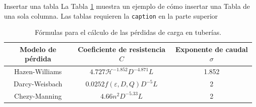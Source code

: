 \documentclass{beamer}
\begin{document}
\begin{frame}{Insertar una tabla}
    La Tabla \ref{tab:ModelosPerdida} muestra un ejemplo de cómo insertar una Tabla de una sola columna. Las tablas requieren la \texttt{caption} en la parte superior
    
    \begin{table}[htbp]
        \centering
         \caption{Fórmulas para el cálculo de las pérdidas de carga en tuberías.}
         \vspace{-\baselineskip}
        \label{tab:ModelosPerdida}
        \small
        \begin{tabular}{ccc}
            \toprule
            \textbf{Modelo de pérdida} & \textbf{Coeficiente de resistencia} $C$ & \textbf{Exponente de caudal} $\sigma$ \\
            \midrule
            Hazen-Williams & $4.727 \mathscr{H}^{-1.852}D^{-4.871}L$ & 1.852 \\
            Darcy-Weisbach & $0.0252f(\varepsilon, D, Q)D^{-5}L$ & 2 \\
            Chezy-Manning & $4.66n^2D^{-5.33}L$ & 2 \\
            \bottomrule
        \end{tabular}
    \end{table}
\end{frame}
\end{document}
